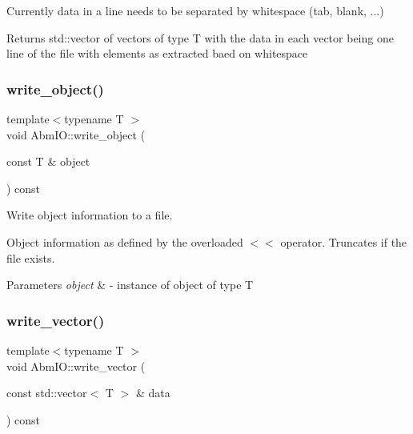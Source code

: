 Currently data in a line needs to be separated by whitespace (tab, blank, ...) \begin{DoxyReturn}{Returns}
std\+::vector of vectors of type T with the data in each vector being one line of the file with elements as extracted baed on whitespace 
\end{DoxyReturn}
\mbox{\label{classAbmIO_a18d9fb3dfa9b074943e1c9e708dfe56d}} 
\subsubsection{\texorpdfstring{write\+\_\+object()}{write\_object()}}
{\footnotesize\ttfamily template$<$typename T $>$ \\
void Abm\+I\+O\+::write\+\_\+object (\begin{DoxyParamCaption}\item[{const T \&}]{object }\end{DoxyParamCaption}) const}



Write object information to a file. 

Object information as defined by the overloaded $<$$<$ operator. Truncates if the file exists. 
\begin{DoxyParams}{Parameters}
{\em object} & -\/ instance of object of type T \\
\hline
\end{DoxyParams}
\mbox{\label{classAbmIO_a0cd34d6379af33faca512b82f8743a19}} 
\subsubsection{\texorpdfstring{write\+\_\+vector()}{write\_vector()}\hspace{0.1cm}{\footnotesize\ttfamily [1/2]}}
{\footnotesize\ttfamily template$<$typename T $>$ \\
void Abm\+I\+O\+::write\+\_\+vector (\begin{DoxyParamCaption}\item[{const std\+::vector$<$ T $>$ \&}]{data }\end{DoxyParamCaption}) const}



